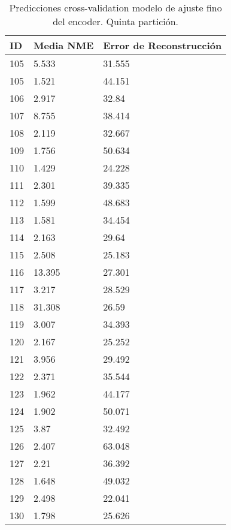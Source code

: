 \begin{table}[!ht]
    \centering
    \caption{Predicciones cross-validation modelo de ajuste fino del encoder. Quinta partición.}
    \begin{tabular}{|l|l|l|}
    \hline
    \cellcolor{gray!25}\textbf{ID} & \cellcolor{gray!25}\textbf{Media NME} & \cellcolor{gray!25}\textbf{Error de Reconstrucción} \\ \hline
        105 & 5.533 & 31.555 \\ \hline
        105 & 1.521 & 44.151 \\ \hline
        106 & 2.917 & 32.84 \\ \hline
        107 & 8.755 & 38.414 \\ \hline
        108 & 2.119 & 32.667 \\ \hline
        109 & 1.756 & 50.634 \\ \hline
        110 & 1.429 & 24.228 \\ \hline
        111 & 2.301 & 39.335 \\ \hline
        112 & 1.599 & 48.683 \\ \hline
        113 & 1.581 & 34.454 \\ \hline
        114 & 2.163 & 29.64 \\ \hline
        115 & 2.508 & 25.183 \\ \hline
        116 & 13.395 & 27.301 \\ \hline
        117 & 3.217 & 28.529 \\ \hline
        118 & 31.308 & 26.59 \\ \hline
        119 & 3.007 & 34.393 \\ \hline
        120 & 2.167 & 25.252 \\ \hline
        121 & 3.956 & 29.492 \\ \hline
        122 & 2.371 & 35.544 \\ \hline
        123 & 1.962 & 44.177 \\ \hline
        124 & 1.902 & 50.071 \\ \hline
        125 & 3.87 & 32.492 \\ \hline
        126 & 2.407 & 63.048 \\ \hline
        127 & 2.21 & 36.392 \\ \hline
        128 & 1.648 & 49.032 \\ \hline
        129 & 2.498 & 22.041 \\ \hline
        130 & 1.798 & 25.626 \\ \hline
    \end{tabular}
\end{table}

\endinput

